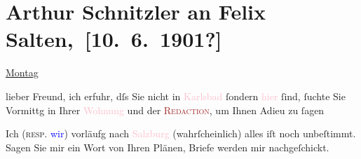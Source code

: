 

\renewcommand{\erwaehntePersonen}{Personen: Felix Salten, Olga Schnitzler}
\renewcommand{\erwaehnteInstitutionen}{Institutionen: Wiener Allgemeine Zeitung}
\renewcommand{\erwaehnteOrte}{Orte: Karlsbad, Kochgasse, Salzburg, Wien}
\renewcommand{\erwaehnteWerke}{Werke: Der einsame Weg. Schauspiel in fünf Akten, Die Frau mit dem Dolche, Lebendige Stunden, Tagebuch}
\section[ Arthur Schnitzler an Felix Salten, {[}10. 6. 1901?{]}]{Arthur Schnitzler an Felix Salten, {[}10. 6. 1901?{]}}
\nopagebreak{}
\rehead{ }\normalsize\beginnumbering{}
\toendnotes[C]{\smallbreak\pagebreak[2]}
\toendnotes[C]{\smallbreak}
\pstart
           \raggedleft{}{\pb}\uline{Montag}\pend
           
\pstart
           lieber Freund, ich erfuhr, dſs Sie nicht in \textcolor{pink}{Karlsbad}{}\ledrightnote{\textcolor{pink}{Karlsbad}} ſondern \textcolor{pink}{hier}{}\ledrightnote{{$\rightarrow$}\textcolor{pink}{Wien}} ſind, ſuchte Sie Vormittg in
               Ihrer \textcolor{pink}{Wohnung}{}\ledrightnote{{$\rightarrow$}\textcolor{pink}{Kochgasse}} und der \textsc{\textcolor{brown}{Redaction}{}\ledrightnote{{$\rightarrow$}\textcolor{brown}{Wiener Allgemeine Zeitung}}}, um Ihnen Adieu zu ſagen\pend
           
\pstart
           {\pb}Ich \introOben{}(\textsc{resp}. \textcolor{blue}{wir}{}\ledrightnote{{$\rightarrow$}\textcolor{blue}{Olga Schnitzler}})\introOben{}{ }\label{K_L03038-1v}\label{K_L03038-1h} vorläufg nach \textcolor{pink}{Salzburg}{}\ledrightnote{\textcolor{pink}{Salzburg}}
               (wahrſcheinlich) alles \label{K_L03038-2v}\label{K_L03038-2h} iſt noch unbeſtimmt. Sagen Sie mir ein Wort von Ihren Plänen, Briefe werden
               mir nachgeſchickt.\pend
           
